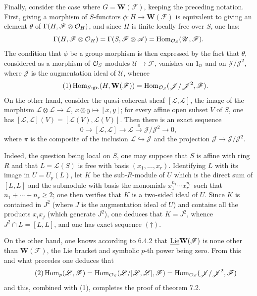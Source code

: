 \par
{}
Finally, consider the case where $G=\mathbf W(\mathscr F)$, keeping the preceding notation. First, giving a morphism of $S$-functors $\phi:H\to\mathbf W(\mathscr F)$ is equivalent to giving an element $\theta$ of $\Gamma(H,\mathscr F\otimes\mathcal{O}_H)$, and since $H$ is finite locally free over $S$, one has:
\[
\Gamma(H,\mathscr F\otimes\mathcal{O}_H)=\Gamma(S,\mathscr F\otimes\mathscr A)=\operatorname{Hom}_{\mathcal{O}_S}(\mathscr U,\mathscr F).
\]
The condition that $\phi$ be a group morphism is then expressed by the fact that $\theta$, considered as a morphism of $\mathcal{O}_S$-modules $\mathscr U\to\mathscr F$, vanishes on $1_{\mathscr U}$ and on $\mathscr J/\mathscr J^2$, where $\mathscr J$ is the augmentation ideal of $\mathscr U$, whence
\begin{equation}\tag{1}
\operatorname{Hom}_{S\text{-gr.}}(H,\mathbf W(\mathscr F))=\operatorname{Hom}_{\mathcal{O}_S}(\mathscr J/\mathscr J^2,\mathscr F).
\end{equation}
On the other hand, consider the quasi-coherent sheaf $[\mathscr L,\mathscr L]$, the image of the morphism $\mathscr L\otimes\mathscr L\to\mathscr L$, $x\otimes y\mapsto[x,y]$; for every affine open subset $V$ of $S$, one has $[\mathscr L,\mathscr L](V)=[\mathscr L(V),\mathscr L(V)]$. Then there is an exact sequence
\begin{equation}\tag{$\dagger$}
0\longrightarrow[\mathscr L,\mathscr L]\longrightarrow\mathscr L\xrightarrow{\pi}\mathscr J/\mathscr J^2\longrightarrow0,
\end{equation}
where $\pi$ is the composite of the inclusion $\mathscr L\hookrightarrow\mathscr J$ and the projection $\mathscr J\to\mathscr J/\mathscr J^2$.

Indeed, the question being local on $S$, one may suppose that $S$ is affine with ring $R$ and that $L=\mathscr L(S)$ is free with basis $(x_1,\ldots,x_r)$. Identifying $L$ with its image in $U=U_p(L)$, let $K$ be the sub-$R$-module of $U$ which is the direct sum of $[L,L]$ and the submodule with basis the monomials $x_1^{n_1}\cdots x_r^{n_r}$ such that $n_1+\cdots+n_r\geq2$; one then verifies that $K$ is a two-sided ideal of $U$. Since $K$ is contained in $J^2$ (where $J$ is the augmentation ideal of $U$) and contains all the products $x_ix_j$ (which generate $J^2$), one deduces that $K=J^2$, whence $J^2\cap L=[L,L]$, and one has exact sequence $(\dagger)$.

On the other hand, one knows according to 6.4.2 that $\underline{\operatorname{Lie}}\mathbf W(\mathscr F)$ is none other than $\mathbf W(\mathscr F)$, the Lie bracket and symbolic $p$-th power being zero. From this and what precedes one deduces that
\begin{equation}\tag{2}
\operatorname{Hom}_p(\mathscr L,\mathscr F)=\operatorname{Hom}_{\mathcal{O}_S}(\mathscr L/[\mathscr L,\mathscr L],\mathscr F)=\operatorname{Hom}_{\mathcal{O}_S}(\mathscr J/\mathscr J^2,\mathscr F)
\end{equation}
and this, combined with (1), completes the proof of theorem 7.2.

